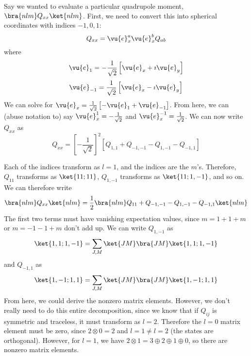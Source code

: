 \documentclass[a4paper,twoside,master.tex]{subfiles}
\begin{document}
Say we wanted to evaluate a particular quadrupole moment,  $\bra{nlm} Q_{xx}\ket{nlm} $. First, we need to convert this into spherical coordinates with indices $ -1, 0, 1 $:
\begin{equation}
    Q_{xx} = \vu{e}_x^a \vu{e}_x^b Q_{ab}
\end{equation}
where
\begin{equation}
    \vu{e}_1 = - \frac{1}{\sqrt{2}} \left[ \vu{e}_x + \imath \vu{e}_y \right]
\end{equation}
\begin{equation}
    \vu{e}_{-1} = \frac{1}{\sqrt{2}} \left[ \vu{e}_x - \imath \vu{e}_y \right]
\end{equation}
We can solve for $ \vu{e}_x = \frac{1}{\sqrt{2}} \left[ - \vu{e}_1 + \vu{e}_{-1} \right] $. From here, we can (abuse notation to) say $ \vu{e}_x^1 = - \frac{1}{\sqrt{2}} $ and $ \vu{e}_x^{-1} = \frac{1}{\sqrt{2}} $. We can now write $ Q_{xx} $ as
\begin{equation}
    Q_{xx} = \left[- \frac{1}{\sqrt{2}} \right]^2 \left[ Q_{1,1} + Q_{-1,-1} - Q_{1,-1} - Q_{-1,1} \right]
\end{equation}

Each of the indices transform as $ l=1 $, and the indices are the $ m $'s. Therefore, $ Q_{11} $ transforms as $\ket{11;11} $, $ Q_{1,-1} $ transforms as $\ket{11;1,-1} $, and so on. We can therefore write
\begin{equation}
    \bra{nlm} Q_{xx}\ket{nlm} = \frac{1}{2}\bra{nlm} Q_{11} + Q_{-1,-1} - Q_{1,-1} - Q_{-1,1}\ket{nlm} 
\end{equation}
The first two terms must have vanishing expectation values, since $ m = 1 + 1 + m $ or $ m = -1 - 1 + m $ don't add up.
We can write $ Q_{1,-1} $ as
\begin{equation}
    \ket{1,1;1,-1} = \sum_{J,M}\ket{JM}\bra{JM}\ket{1,1;1,-1}
\end{equation}
and $ Q_{-1,1} $ as
\begin{equation}
    \ket{1,-1;1,1} = \sum_{J,M}\ket{JM}\bra{JM}\ket{1,-1;1,1}
\end{equation}
From here, we could derive the nonzero matrix elements. However, we don't really need to do this entire decomposition, since we know that if $ Q_{ij} $ is symmetric and traceless, it must transform as $ l=2 $. Therefore the $ l=0 $ matrix element must be zero, since $ 2 \otimes 0 = 2 $ and $ l=1 \neq l=2 $ (the states are orthogonal). However, for $ l=1 $, we have $ 2 \otimes 1 = 3 \oplus 2 \oplus 1 \oplus 0 $, so there are nonzero matrix elements.
\end{document}
